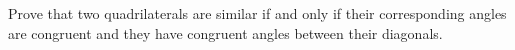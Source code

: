 Prove that two quadrilaterals are similar if and only if
their corresponding angles are congruent
and they have congruent angles between their diagonals.

